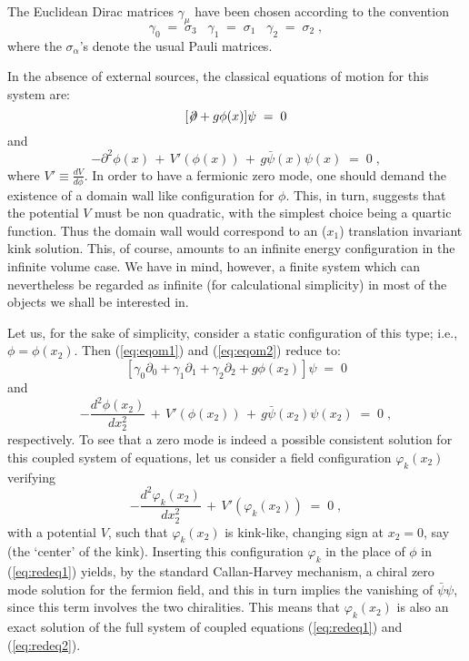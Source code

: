 \documentclass[a4paper,12pt]{article}
\begin{document}
The Euclidean Dirac matrices $\gamma_\mu$ have been chosen according
to the convention
\begin{equation}\label{dfgp}
\gamma_0\;=\;\sigma_3 \;\;\;\gamma_1\;=\;\sigma_1 
\;\;\;\gamma_2\;=\;\sigma_2\;,
\end{equation}
where the $\sigma_\alpha$'s denote the usual Pauli matrices.

In the absence of external sources, the classical equations of motion
for this system are:
\begin{equation}
  \label{eq:eqom1}
[\not\!\partial + g \phi(x) ] \psi \;=\;0 
\end{equation} 
and
\begin{equation}
  \label{eq:eqom2}
- \partial^2 \phi (x) \,+\, V'(\phi(x)) \,+\, g {\bar\psi}(x) \psi(x) \;=\; 0 \;,
\end{equation}
where $V' \equiv \frac{d V}{d\phi}$.  In order to have a fermionic
zero mode, one should demand the existence of a domain wall like
configuration for $\phi$. This, in turn, suggests that the potential
$V$ must be non quadratic, with the simplest choice being a quartic
function. Thus the domain wall would correspond to an ($x_1$) 
translation invariant kink solution.  This, of course, amounts 
to an infinite energy configuration in the infinite volume case. 
We have in mind, however, a finite system which can nevertheless 
be regarded  as infinite (for calculational simplicity) in most of the
objects we shall be interested in. 

Let us, for the sake of simplicity, consider a static configuration 
of this type; i.e., $\phi = \phi(x_2)$. Then (\ref{eq:eqom1}) and 
(\ref{eq:eqom2}) reduce to:
\begin{equation}
  \label{eq:redeq1}
[\gamma_0 \partial_0 + \gamma_1 \partial_1 + \gamma_2 \partial_2 + g \phi(x_2) ] \psi \;=\;0
\end{equation}
and
\begin{equation}
  \label{eq:redeq2}
- \frac{d^2\phi(x_2)}{dx_2^2} \,+\, V'(\phi(x_2)) \,+\,
 g {\bar\psi}(x_2) \psi(x_2) \;=\; 0 \;,
\end{equation}
respectively. To see that a zero mode is indeed a possible consistent
solution for this coupled system of equations, let us consider a field
configuration $\varphi_k(x_2)$ verifying
\begin{equation}
  \label{eq:redeq21}
- \frac{d^2\varphi_k(x_2)}{dx_2^2} \,+\, V'(\varphi_k(x_2)) \;=\; 0 \;,
\end{equation}
with a potential $V$, such that $\varphi_k(x_2)$ is kink-like, changing
sign at $x_2=0$, say (the `center' of the kink). Inserting this
configuration $\varphi_k$ in the place of $\phi$ in (\ref{eq:redeq1})
yields, by the standard Callan-Harvey mechanism, a chiral zero mode 
solution for the fermion field, and this in
turn implies the vanishing of ${\bar\psi}\psi$, since this term
involves the two chiralities.  This means that $\varphi_k(x_2)$ is also an
exact solution of the full system of coupled equations (\ref{eq:redeq1}) 
and (\ref{eq:redeq2}).
\end{document}
